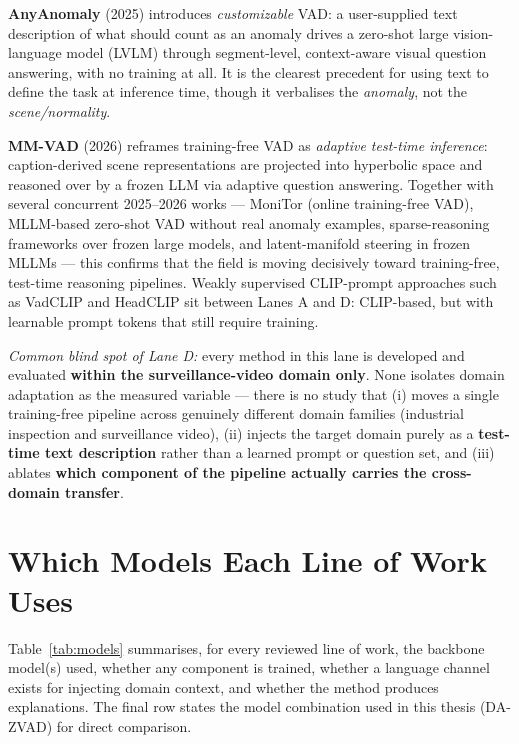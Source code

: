 \documentclass[12pt, a4paper]{article}
\begin{document}
\textbf{AnyAnomaly} (2025) introduces \textit{customizable} VAD: a
user-supplied text description of what should count as an anomaly drives a
zero-shot large vision-language model (LVLM) through segment-level,
context-aware visual question answering, with no training at all. It is the
clearest precedent for using text to define the task at inference time,
though it verbalises the \textit{anomaly}, not the \textit{scene/normality}.

\textbf{MM-VAD} (2026) reframes training-free VAD as \textit{adaptive
test-time inference}: caption-derived scene representations are projected
into hyperbolic space and reasoned over by a frozen LLM via adaptive
question answering. Together with several concurrent 2025--2026 works ---
MoniTor (online training-free VAD), MLLM-based zero-shot VAD without real
anomaly examples, sparse-reasoning frameworks over frozen large models, and
latent-manifold steering in frozen MLLMs --- this confirms that the field is
moving decisively toward training-free, test-time reasoning pipelines.
Weakly supervised CLIP-prompt approaches such as VadCLIP and HeadCLIP sit
between Lanes A and D: CLIP-based, but with learnable prompt tokens that
still require training.

\textit{Common blind spot of Lane D:} every method in this lane is developed
and evaluated \textbf{within the surveillance-video domain only}. None
isolates domain adaptation as the measured variable --- there is no study
that (i) moves a single training-free pipeline across genuinely different
domain families (industrial inspection and surveillance video), (ii) injects
the target domain purely as a \textbf{test-time text description} rather
than a learned prompt or question set, and (iii) ablates \textbf{which
component of the pipeline actually carries the cross-domain transfer}.

\section{Which Models Each Line of Work Uses}

Table~\ref{tab:models} summarises, for every reviewed line of work, the
backbone model(s) used, whether any component is trained, whether a language
channel exists for injecting domain context, and whether the method produces
explanations. The final row states the model combination used in this
thesis (DA-ZVAD) for direct comparison.
\end{document}
